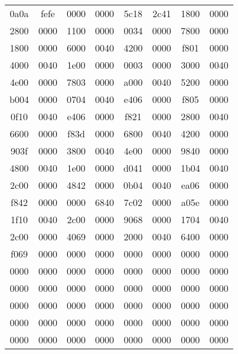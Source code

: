 \begin{table} 
\begin{tabular}{cccccccc} 
\toprule 
0a0a & fefe & 0000 & 0000 & 5c18 & 2c41 & 1800 & 0000
 \\ 
2800 & 0000 & 1100 & 0000 & 0034 & 0000 & 7800 & 0000
 \\ 
1800 & 0000 & 6000 & 0040 & 4200 & 0000 & f801 & 0000
 \\ 
4000 & 0040 & 1e00 & 0000 & 0003 & 0000 & 3000 & 0040
 \\ 
4e00 & 0000 & 7803 & 0000 & a000 & 0040 & 5200 & 0000
 \\ 
b004 & 0000 & 0704 & 0040 & e406 & 0000 & f805 & 0000
 \\ 
0f10 & 0040 & e406 & 0000 & f821 & 0000 & 2800 & 0040
 \\ 
6600 & 0000 & f83d & 0000 & 6800 & 0040 & 4200 & 0000
 \\ 
903f & 0000 & 3800 & 0040 & 4e00 & 0000 & 9840 & 0000
 \\ 
4800 & 0040 & 1e00 & 0000 & d041 & 0000 & 1b04 & 0040
 \\ 
2c00 & 0000 & 4842 & 0000 & 0b04 & 0040 & ea06 & 0000
 \\ 
f842 & 0000 & 0000 & 6840 & 7c02 & 0000 & a05e & 0000
 \\ 
1f10 & 0040 & 2c00 & 0000 & 9068 & 0000 & 1704 & 0040
 \\ 
2c00 & 0000 & 4069 & 0000 & 2000 & 0040 & 6400 & 0000
 \\ 
f069 & 0000 & 0000 & 0000 & 0000 & 0000 & 0000 & 0000
 \\ 
0000 & 0000 & 0000 & 0000 & 0000 & 0000 & 0000 & 0000
 \\ 
0000 & 0000 & 0000 & 0000 & 0000 & 0000 & 0000 & 0000
 \\ 
0000 & 0000 & 0000 & 0000 & 0000 & 0000 & 0000 & 0000
 \\ 
0000 & 0000 & 0000 & 0000 & 0000 & 0000 & 0000 & 0000
 \\ 
0000 & 0000 & 0000 & 0000 & 0000 & 0000 & 0000 & 0000
 \\ 
\bottomrule 
\end{tabular} 
\end{table} 
